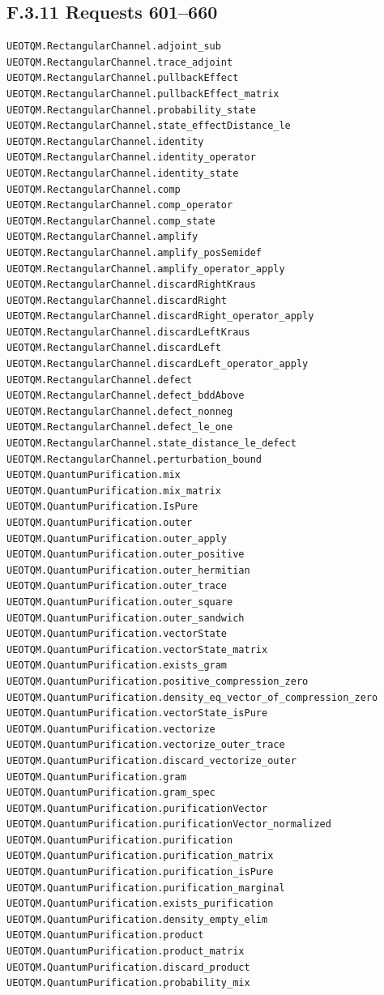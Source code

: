 \documentclass[
  11pt,
  oneside]{book}
\begin{document}
\subsection{F.3.11 Requests 601--660}

\begin{Verbatim}[breaklines,breakanywhere,fontsize=\scriptsize]
UEOTQM.RectangularChannel.adjoint_sub
UEOTQM.RectangularChannel.trace_adjoint
UEOTQM.RectangularChannel.pullbackEffect
UEOTQM.RectangularChannel.pullbackEffect_matrix
UEOTQM.RectangularChannel.probability_state
UEOTQM.RectangularChannel.state_effectDistance_le
UEOTQM.RectangularChannel.identity
UEOTQM.RectangularChannel.identity_operator
UEOTQM.RectangularChannel.identity_state
UEOTQM.RectangularChannel.comp
UEOTQM.RectangularChannel.comp_operator
UEOTQM.RectangularChannel.comp_state
UEOTQM.RectangularChannel.amplify
UEOTQM.RectangularChannel.amplify_posSemidef
UEOTQM.RectangularChannel.amplify_operator_apply
UEOTQM.RectangularChannel.discardRightKraus
UEOTQM.RectangularChannel.discardRight
UEOTQM.RectangularChannel.discardRight_operator_apply
UEOTQM.RectangularChannel.discardLeftKraus
UEOTQM.RectangularChannel.discardLeft
UEOTQM.RectangularChannel.discardLeft_operator_apply
UEOTQM.RectangularChannel.defect
UEOTQM.RectangularChannel.defect_bddAbove
UEOTQM.RectangularChannel.defect_nonneg
UEOTQM.RectangularChannel.defect_le_one
UEOTQM.RectangularChannel.state_distance_le_defect
UEOTQM.RectangularChannel.perturbation_bound
UEOTQM.QuantumPurification.mix
UEOTQM.QuantumPurification.mix_matrix
UEOTQM.QuantumPurification.IsPure
UEOTQM.QuantumPurification.outer
UEOTQM.QuantumPurification.outer_apply
UEOTQM.QuantumPurification.outer_positive
UEOTQM.QuantumPurification.outer_hermitian
UEOTQM.QuantumPurification.outer_trace
UEOTQM.QuantumPurification.outer_square
UEOTQM.QuantumPurification.outer_sandwich
UEOTQM.QuantumPurification.vectorState
UEOTQM.QuantumPurification.vectorState_matrix
UEOTQM.QuantumPurification.exists_gram
UEOTQM.QuantumPurification.positive_compression_zero
UEOTQM.QuantumPurification.density_eq_vector_of_compression_zero
UEOTQM.QuantumPurification.vectorState_isPure
UEOTQM.QuantumPurification.vectorize
UEOTQM.QuantumPurification.vectorize_outer_trace
UEOTQM.QuantumPurification.discard_vectorize_outer
UEOTQM.QuantumPurification.gram
UEOTQM.QuantumPurification.gram_spec
UEOTQM.QuantumPurification.purificationVector
UEOTQM.QuantumPurification.purificationVector_normalized
UEOTQM.QuantumPurification.purification
UEOTQM.QuantumPurification.purification_matrix
UEOTQM.QuantumPurification.purification_isPure
UEOTQM.QuantumPurification.purification_marginal
UEOTQM.QuantumPurification.exists_purification
UEOTQM.QuantumPurification.density_empty_elim
UEOTQM.QuantumPurification.product
UEOTQM.QuantumPurification.product_matrix
UEOTQM.QuantumPurification.discard_product
UEOTQM.QuantumPurification.probability_mix
\end{Verbatim}
\end{document}
